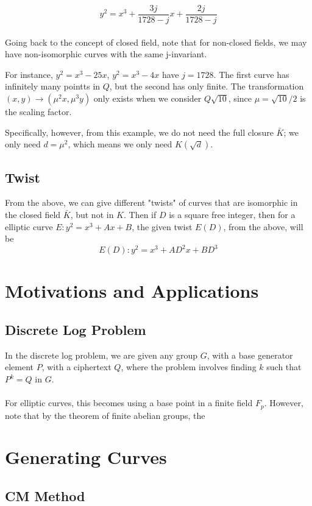 \documentclass[12pt,twoside]{article}
\begin{document}
\begin{equation} 
y^{2}  = x^{3} + \frac{3j}{1728 - j}x + \frac{2j}{1728 - j} 
\end{equation}
\\
Going back to the concept of closed field, note that for non-closed fields, we may have non-isomorphic curves with the same j-invariant. 

For instance, $y^{2} = x^{3} - 25x$, $y^{2} = x^{3} - 4x$ have $j=1728$. The first curve has infinitely many pointts in $Q$, but the second has only finite. The transformation $(x,y) \rightarrow (\mu^{2}x, \mu^{3}y)$ only exists when we consider $Q\sqrt{10}$, since $\mu = \sqrt{10}/2$ is the scaling factor. 

Specifically, however, from this example, we do not need the full closure $\bar{K}$; we only need $d = \mu^{2}$, which means we only need $K(\sqrt{d})$.

\subsection{Twist} 
From the above, we can give different "twists" of curves that are isomorphic in the closed field $\bar{K}$, but not in $K$. Then if $D$ is a square free integer, then for a elliptic curve $E: y^{2} = x^{3} + Ax + B$, the given twist $E(D)$, from the above, will be 
\begin{equation} 
E(D): y^{2} = x^{3} + AD^{2}x + BD^{3} 
\end{equation}




\section{Motivations and Applications} 

\subsection{Discrete Log Problem}
In the discrete log problem, we are given any group $G$, with a base generator element $P$, with a ciphertext $Q$, where the problem involves finding $k$ such that $P^{k} = Q$ in $G$. \\ \\
For elliptic curves, this becomes using a base point in a finite field $F_{p}$. However, note that by the theorem of finite abelian groups, the  

\section{Generating Curves} 

\subsection{CM Method} 















\end{document}
